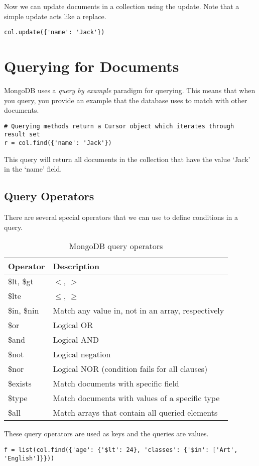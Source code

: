 Now we can update documents in a collection using the update.
Note that a simple update acts like a replace.
\begin{lstlisting}
col.update({'name': 'Jack'})
\end{lstlisting}



\section*{Querying for Documents}
MongoDB uses a \emph{query by example} paradigm for querying.
This means that when you query, you provide an example that the database uses to match with other documents.
\begin{lstlisting}
# Querying methods return a Cursor object which iterates through result set
r = col.find({'name': 'Jack'})
\end{lstlisting}
This query will return all documents in the collection that have the value `Jack' in the `name' field.


\subsection*{Query Operators}
There are several special operators that we can use to define conditions in a query.
\begin{table}
\begin{tabular}{|l|l|}
\hline
Operator & Description \\
\hline
\$lt, \$gt & $<$, $>$ \\
\$lte & $\leq$, $\geq$ \\
\$in, \$nin & Match any value in, not in an array, respectively \\
\hline
\$or & Logical OR \\
\$and & Logical AND \\
\$not & Logical negation \\
\$nor & Logical NOR (condition fails for all clauses) \\
\hline
\$exists & Match documents with specific field \\
\$type & Match documents with values of a specific type \\
\hline
\$all & Match arrays that contain all queried elements \\
\end{tabular}
\caption{MongoDB query operators}
\label{table:queryoperators}
\end{table}
These query operators are used as keys and the queries are values.
\begin{lstlisting}
f = list(col.find({'age': {'$lt': 24}, 'classes': {'$in': ['Art', 'English']}}))
\end{lstlisting}


